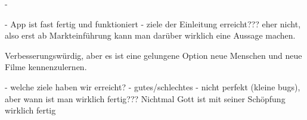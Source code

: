 -


- App ist fast fertig und funktioniert
- ziele der Einleitung erreicht??? eher nicht, also erst ab Markteinführung kann man darüber wirklich eine Aussage machen.


Verbesserungswürdig, aber es ist eine gelungene Option neue Menschen und neue Filme kennenzulernen.


- welche ziele haben wir erreicht?
- gutes/schlechtes
- nicht perfekt (kleine bugs), aber wann ist man wirklich fertig??? Nichtmal Gott ist mit seiner Schöpfung wirklich fertig